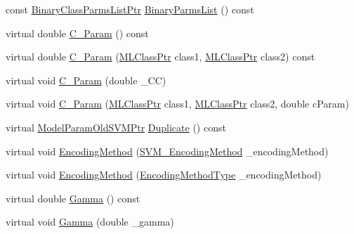 \begin{DoxyCompactItemize}
\item 
const \hyperlink{namespace_k_k_m_l_l_a15376316ebec0ec5e4d1f11cfb06c15b}{Binary\+Class\+Parms\+List\+Ptr} \hyperlink{class_k_k_m_l_l_1_1_model_param_old_s_v_m_ae040200e815aca1ad5bffba8c8214d7d}{Binary\+Parms\+List} () const 
\item 
virtual double \hyperlink{class_k_k_m_l_l_1_1_model_param_old_s_v_m_a0d3c06e12b761313380fe2a9dd9ab136}{C\+\_\+\+Param} () const 
\item 
virtual double \hyperlink{class_k_k_m_l_l_1_1_model_param_old_s_v_m_a65f26e4de8b6d05d55d76ef89c71a996}{C\+\_\+\+Param} (\hyperlink{namespace_k_k_m_l_l_ac272393853d59e72e8456f14cd6d8c23}{M\+L\+Class\+Ptr} class1, \hyperlink{namespace_k_k_m_l_l_ac272393853d59e72e8456f14cd6d8c23}{M\+L\+Class\+Ptr} class2) const 
\item 
virtual void \hyperlink{class_k_k_m_l_l_1_1_model_param_old_s_v_m_a5d0e13c09d29ec741ab1113921e49589}{C\+\_\+\+Param} (double \+\_\+\+CC)
\item 
virtual void \hyperlink{class_k_k_m_l_l_1_1_model_param_old_s_v_m_a48808a5ddb38cbebc19ced7de1506bf0}{C\+\_\+\+Param} (\hyperlink{namespace_k_k_m_l_l_ac272393853d59e72e8456f14cd6d8c23}{M\+L\+Class\+Ptr} class1, \hyperlink{namespace_k_k_m_l_l_ac272393853d59e72e8456f14cd6d8c23}{M\+L\+Class\+Ptr} class2, double c\+Param)
\item 
virtual \hyperlink{class_k_k_m_l_l_1_1_model_param_old_s_v_m_aa1bc211ca33acbe49fa1d8dd2bd67782}{Model\+Param\+Old\+S\+V\+M\+Ptr} \hyperlink{class_k_k_m_l_l_1_1_model_param_old_s_v_m_a6849662be6e8cdbdf36113e8e9ef0c5b}{Duplicate} () const 
\item 
virtual void \hyperlink{class_k_k_m_l_l_1_1_model_param_old_s_v_m_a3c1f5f65f72dbd128d17b05bd2b0d34f}{Encoding\+Method} (\hyperlink{namespace_k_k_m_l_l_a1994af1d94ca5bf6e27f0cf803a8d64c}{S\+V\+M\+\_\+\+Encoding\+Method} \+\_\+encoding\+Method)
\item 
virtual void \hyperlink{class_k_k_m_l_l_1_1_model_param_old_s_v_m_a8d94389691d9322a0472e888b86c0024}{Encoding\+Method} (\hyperlink{class_k_k_m_l_l_1_1_model_param_a09e49f936f411dba6f08bdaf8d6b4a98}{Encoding\+Method\+Type} \+\_\+encoding\+Method)
\item 
virtual double \hyperlink{class_k_k_m_l_l_1_1_model_param_old_s_v_m_ad931d239b798bcf3266155b1de13cbc9}{Gamma} () const 
\item 
virtual void \hyperlink{class_k_k_m_l_l_1_1_model_param_old_s_v_m_a13473f59a263552f7552e4fc08593e9f}{Gamma} (double \+\_\+gamma)
\item 

\end{DoxyCompactItemize}
